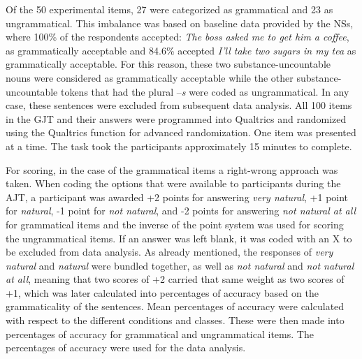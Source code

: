 \documentclass[12pt]{article}
\newenvironment{styleStandard}{\setlength\leftskip{0cm}\setlength\rightskip{0cm plus 1fil}\setlength\parindent{0cm}\setlength\parfillskip{0pt plus 1fil}\setlength\parskip{0in plus 1pt}\writerlistparindent\writerlistleftskip\leavevmode\normalfont\normalsize\writerlistlabel\ignorespaces}{\unskip\vspace{0.111in plus 0.0111in}\par}
\newcommand\writerlistleftskip{}
\newcommand\writerlistparindent{}
\newcommand\writerlistlabel{}
\begin{document}
\begin{styleStandard}
Of the 50 experimental items, 27 were categorized as grammatical and 23 as ungrammatical. This imbalance was based on baseline data provided by the NSs, where 100\% of the respondents accepted: \textit{The boss asked me to get him a coffee}, as grammatically acceptable and 84.6\% accepted \textit{I’ll take two sugars in my tea} as grammatically acceptable. For this reason, these two substance-uncountable nouns were considered as grammatically acceptable while the other substance-uncountable tokens that had the plural –\textit{s} were coded as ungrammatical. In any case, these sentences were excluded from subsequent data analysis. All 100 items in the GJT and their answers were programmed into Qualtrics and randomized using the Qualtrics function for advanced randomization. One item was presented at a time. The task took the participants approximately 15 minutes to complete. 
\end{styleStandard}

\begin{styleStandard}
For scoring, in the case of the grammatical items a right-wrong approach was taken. When coding the options that were available to participants during the AJT, a participant was awarded +2 points for answering \textit{very natural}, +1 point for \textit{natural}, -1 point for \textit{not natural}, and -2 points for answering \textit{not natural at all} for grammatical items and the inverse of the point system was used for scoring the ungrammatical items. If an answer was left blank, it was coded with an X to be excluded from data analysis. As already mentioned, the responses of \textit{very natural }and \textit{natural} were bundled together, as well as \textit{not natural} and \textit{not natural at all}, meaning that two scores of +2 carried that same weight as two scores of +1, which was later calculated into percentages of accuracy based on the grammaticality of the sentences. Mean percentages of accuracy were calculated with respect to the different conditions and classes. These were then made into percentages of accuracy for grammatical and ungrammatical items. The percentages of accuracy were used for the data analysis.
\end{styleStandard}
\end{document}
